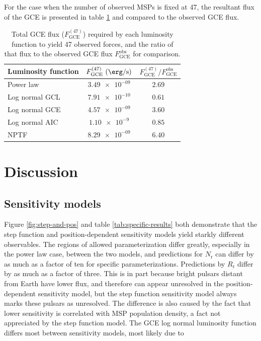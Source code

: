 \documentclass[a4paper,11pt]{article}
\newcommand{\comment}[1]{\emph{\color{red}{#1}}}
\begin{document}
For the case when the number of observed MSPs is fixed at 47, the resultant flux of the GCE is presented in table \ref{tab:rescaled-gce-flux} and compared to the observed GCE flux.

\begin{table}
    \centering
    \begin{tabular} {|l|c|c|}
        \hline
        Luminosity function & $F_\text{GCE}^{(47)}\ (\SI{}{\erg\per\second})$ & $F^{(47)}_\text{GCE} / F^\text{obs}_\text{GCE}$\\ \hline \hline
        Power law & $\num{3.49e-09}$ & $\num{2.69}$\\
        Log normal GCL & $\num{7.91e-10}$ & $\num{0.61}$ \\
        Log normal GCE & $\num{4.57e-09}$ & $\num{3.60}$\\
        Log normal AIC & $\num{1.10e-9}$ & $\num{0.85}$ \\
        NPTF & $\num{8.29e-09}$ & $\num{6.40}$\\
        \hline
    \end{tabular}
    \caption{Total GCE flux ($F_\text{GCE}^{(47)}$) required by each luminosity function to yield 47 observed forces, and the ratio of that flux to the observed GCE flux $F_\text{GCE}^\text{obs}$ for comparison.}
    \label{tab:rescaled-gce-flux}
\end{table}





\section{Discussion}

\subsection{Sensitivity models}
Figure \ref{fig:step-and-pos} and table \ref{tab:specific-results} both demonstrate that the step function and position-dependent sensitivity models yield starkly different observables. The regions of allowed parameterization differ greatly, especially in the power law case, between the two models, and predictions for $N_\text{r}$ can differ by as much as a factor of ten for specific parameterizations. Predictions by $R_\text{r}$ differ by as much as a factor of three. This is in part because bright pulsars distant from Earth have lower flux, and therefore can appear unresolved in the position-dependent sensitivity model, but the step function sensitivity model always marks these pulsars as unresolved. The difference is also caused by the fact that lower sensitivity is correlated with MSP population density, a fact not appreciated by the step function model. The GCE log normal luminosity function differs most between sensitivity models, most likely due to \comment{its thinness and low mean, but I need to think more about exactly why this is.}
\end{document}
